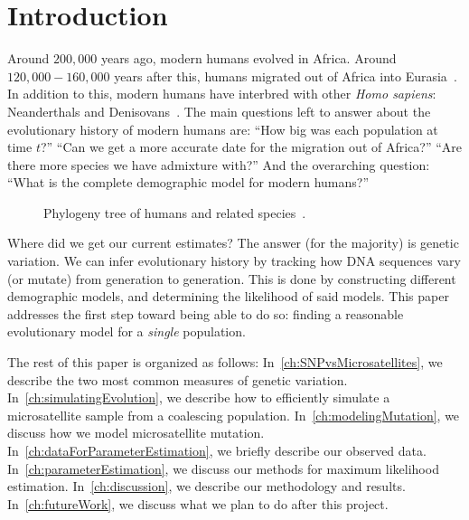 \chapter{Introduction}\label{ch:introduction}
Around $200,000$ years ago, modern humans evolved in Africa.
Around $120,000-160,000$ years after this, humans migrated out of Africa into
Eurasia~\cite{campbellEvolutionHumanGenetic2010}.
In addition to this, modern humans have interbred with other \textit{Homo sapiens}: Neanderthals and
Denisovans~\cite{sankararamanCombinedLandscapeDenisovan2016}.
The main questions left to answer about the evolutionary history of modern humans are:
``How big was each population at time $t$?''
``Can we get a more accurate date for the migration out of Africa?''
``Are there more species we have admixture with?''
And the overarching question: ``What is the complete demographic model for modern humans?''
\begin{figure}[th]
    \caption{
    Phylogeny tree of humans and related species~\cite{riceReview18Organic}.
    }\label{fig:overviewEvolution}
\end{figure}

Where did we get our current estimates?
The answer (for the majority) is genetic variation.
We can infer evolutionary history by tracking how DNA sequences vary (or mutate) from generation to generation.
This is done by constructing different demographic models, and determining the likelihood of said models.
This paper addresses the first step toward being able to do so: finding a reasonable evolutionary model for a
\emph{single} population.

The rest of this paper is organized as follows:
In~\autoref{ch:SNPvsMicrosatellites}, we describe the two most common measures of genetic variation.
In~\autoref{ch:simulatingEvolution}, we describe how to efficiently simulate a microsatellite sample from a coalescing
population.
In~\autoref{ch:modelingMutation}, we discuss how we model microsatellite mutation.
In~\autoref{ch:dataForParameterEstimation}, we briefly describe our observed data.
In~\autoref{ch:parameterEstimation}, we discuss our methods for maximum likelihood estimation.
In~\autoref{ch:discussion}, we describe our methodology and results.
In~\autoref{ch:futureWork}, we discuss what we plan to do after this project.
